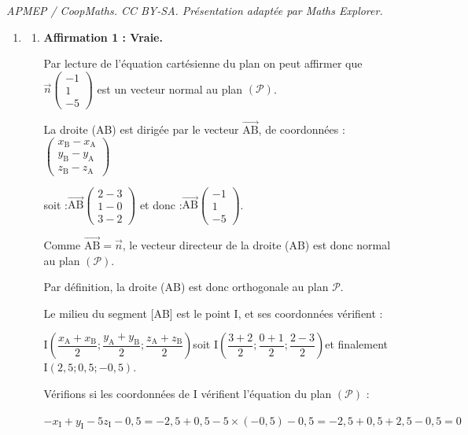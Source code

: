 \documentclass[10pt]{article}
\providecommand{\vect}[1]{\overrightarrow{#1}}
\providecommand{\vectt}[1]{\overrightarrow{\mathrm{#1}}}
\begin{document}
\noindent\textit{APMEP / CoopMaths. CC BY-SA. Présentation adaptée par Maths Explorer.}\par\medskip
\begin{enumerate}
		\item \begin{enumerate}
			\item \textbf{Affirmation 1 : Vraie.}

			Par lecture de l'équation cartésienne du plan on peut affirmer que $\vect{n}\begin{pmatrix}-1\\1\\-5\end{pmatrix}$ est un vecteur normal au plan $(\mathcal{P})$.

			La droite (AB) est dirigée par le vecteur $\vectt{AB}$, de coordonnées : \quad $\begin{pmatrix} x_{\mathrm{B}} - x_{\mathrm{A}} \\ y_{\mathrm{B}} - y_{\mathrm{A}} \\ z_{\mathrm{B}} - z_{\mathrm{A}} \end{pmatrix} $

			soit :\quad $\vectt{AB} \begin{pmatrix} 2 - 3\\1-0\\3-2 \end{pmatrix} $ \quad et donc :\quad $\vectt{AB} \begin{pmatrix} -1\\1\\-5 \end{pmatrix} $.

			Comme $\vectt{AB} = \vect{n}$, le vecteur directeur de la droite (AB) est donc normal au plan $(\mathcal{P})$.

			Par définition, la droite (AB) est donc orthogonale au plan $\mathcal{P}$.

			Le milieu du segment [AB] est le point I, et ses coordonnées vérifient :

			$\mathrm{I}\left(\dfrac{x_{\mathrm{A}} + x_{\mathrm{B}}}{2} ; \dfrac{y_{\mathrm{A}} + y_{\mathrm{B}}}{2} ; \dfrac{z_{\mathrm{A}} + z_{\mathrm{B}}}{2}\right) $\quad soit \quad $\mathrm{I} \left(\dfrac{3+2}{2} ; \dfrac{0+1}{2} ; \dfrac{2-3}{2}\right) $\quad et finalement \quad $\mathrm{I}(2,5 ; 0,5 ; -0,5)$.

			Vérifions si les coordonnées de I vérifient l'équation du plan $(\mathcal{P})$ :

			$-x_{\mathrm{I}}+y_{\mathrm{I}}-5 z_{\mathrm{I}}-0,5= -2,5 +  0,5 -5 \times (-0,5) - 0,5 = -2,5 +0,5 + 2,5 - 0,5 = 0$


\end{enumerate}
\end{enumerate}
\end{document}
